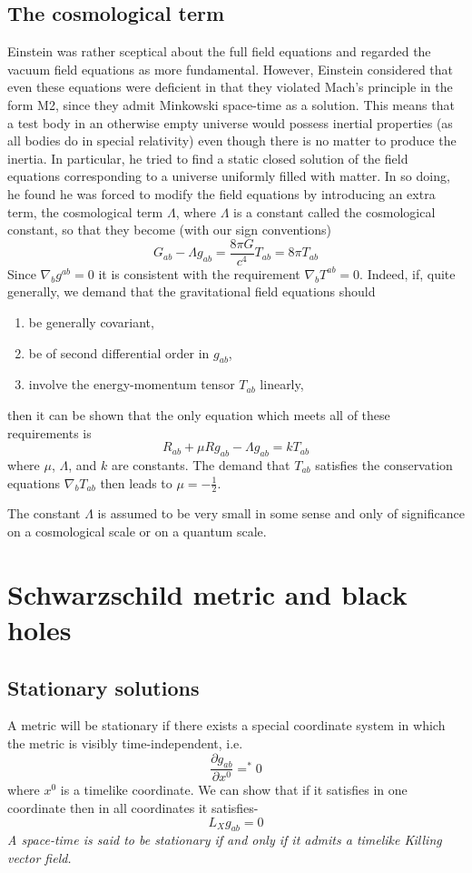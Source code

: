 \documentclass[12pt,a4paper]{article}
\numberwithin{table}{section}
\numberwithin{figure}{section}
\numberwithin{equation}{section}
\theoremstyle{remark}
\theoremstyle{definition}
\begin{document}
\subsection{The cosmological term}
Einstein was rather sceptical about the full field equations and regarded the vacuum field equations as more fundamental. However, Einstein considered that even these equations were deficient in that they violated Mach's principle in the form M2, since they admit Minkowski space-time as a solution. This means that a test body in an otherwise empty universe would possess inertial properties (as all bodies do in special relativity) even though there is no matter to produce the inertia. In particular, he tried to find a static 
closed solution of the field equations corresponding to a universe uniformly 
filled with matter. In so doing, he found he was forced to modify the field 
equations by introducing an extra term, the cosmological term $\Lambda$, where $\Lambda$ is a constant called the cosmological constant, so that they become (with our sign conventions)
\begin{equation}
    G_{ab}-\Lambda g_{ab}=\dfrac{8\pi G}{c^4} T_{ab}=8\pi T_{ab}
\end{equation}
Since $\nabla_b g^{ab}=0$ it is consistent with the requirement $\nabla_b T^{ab}=0 $. Indeed, if, quite generally, we demand that the gravitational field equations should
\begin{enumerate}
    \item be generally covariant,
    \item be of second differential order in $g_{ab}$,
    \item involve the energy-momentum tensor $T_{ab}$ linearly,
\end{enumerate}
then it can be shown that the only equation which meets all of these 
requirements is 
$$R_{ab}+\mu Rg_{ab}-\Lambda g_{ab}=kT_{ab} $$
where $\mu$, $\Lambda$, and $k$ are constants. The demand that $T_{ab}$ satisfies the conservation equations $\nabla_b T_{ab}$ then leads to $\mu=-\frac{1}{2}$.

The constant $\Lambda$ is assumed to be very small in 
some sense and only of significance on a cosmological scale or on a quantum scale. 


\section{Schwarzschild metric and black holes}
\subsection*{Stationary solutions}
A metric will be stationary if there exists a special coordinate system in 
which the metric is visibly time-independent, i.e. 
\begin{equation}
    \dfrac{\partial g_{ab}}{\partial x^0}=^{*}0
\end{equation}
where $x^0$ is a timelike coordinate. We can show that if it satisfies in one coordinate then in all coordinates it satisfies-
\begin{equation}
    L_{X}g_{ab}=0
\end{equation}
\textit{A space-time is said to be stationary if and only if it admits a timelike Killing vector field.}
\end{document}

